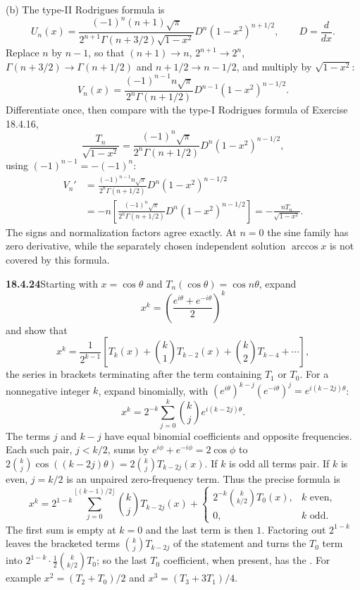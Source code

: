 (b) The type-II Rodrigues formula is
\[
U_n(x)=\frac{(-1)^n(n+1)\sqrt\pi}{2^{n+1}\Gamma(n+3/2)\sqrt{1-x^2}}
 D^n(1-x^2)^{n+1/2},\qquad D=\frac d{dx}.
\]
Replace $n$ by $n-1$, so that $(n+1)\to n$, $2^{n+1}\to2^n$,
$\Gamma(n+3/2)\to\Gamma(n+1/2)$ and $n+1/2\to n-1/2$, and multiply
by $\sqrt{1-x^2}$:
\[
V_n(x)=\frac{(-1)^{n-1}n\sqrt\pi}{2^n\Gamma(n+1/2)}
 D^{n-1}(1-x^2)^{n-1/2}.
\]
Differentiate once, then compare with the type-I Rodrigues formula
of Exercise 18.4.16,
\[
\frac{T_n}{\sqrt{1-x^2}}
 =\frac{(-1)^n\sqrt\pi}{2^n\Gamma(n+1/2)}D^n(1-x^2)^{n-1/2},
\]
using $(-1)^{n-1}=-(-1)^n$:
\begin{align*}
V_n'
 &=\frac{(-1)^{n-1}n\sqrt\pi}{2^n\Gamma(n+1/2)}
      D^n(1-x^2)^{n-1/2}\\
 &=-n\left[\frac{(-1)^n\sqrt\pi}{2^n\Gamma(n+1/2)}
      D^n(1-x^2)^{n-1/2}\right]
 =-\frac{nT_n}{\sqrt{1-x^2}}.
\end{align*}
The signs and normalization factors agree exactly.  At $n=0$ the
sine family has zero derivative, while the separately chosen
independent solution $\arccos x$ is not covered by this formula.

\par\bigskip
\noindent\textbf{18.4.24}\quad Starting with $x=\cos\theta$ and
$T_{n}(\cos\theta)=\cos n\theta$, expand
\[
x^{k}=\left(\frac{e^{i\theta}+e^{-i\theta}}{2}\right)^{k}
\]
and show that
\[
x^{k}=\frac{1}{2^{k-1}}\left[T_{k}(x)+\binom{k}{1}T_{k-2}(x)
+\binom{k}{2}T_{k-4}+\cdots\right],
\]
the series in brackets terminating after the term containing $T_{1}$
or $T_{0}$.
\solution
For a nonnegative integer $k$, expand binomially, with
$(e^{i\theta})^{k-j}(e^{-i\theta})^j=e^{i(k-2j)\theta}$:
\[
x^k=2^{-k}\sum_{j=0}^k\binom kj e^{i(k-2j)\theta}.
\]
The terms $j$ and $k-j$ have equal binomial coefficients and
opposite frequencies.  Each such pair, $j<k/2$, sums by
$e^{i\phi}+e^{-i\phi}=2\cos\phi$ to
$2\binom kj\cos((k-2j)\theta)=2\binom kjT_{k-2j}(x)$.
If $k$ is odd all terms pair.  If $k$ is even, $j=k/2$ is
an unpaired zero-frequency term.  Thus the precise formula is
\[
\boxed{x^k=2^{1-k}\sum_{j=0}^{\lfloor(k-1)/2\rfloor}
 \binom kjT_{k-2j}(x)
 +\begin{cases}2^{-k}\binom k{k/2}T_0(x),&k\text{ even},\\
 0,&k\text{ odd}.
 \end{cases}}
\]
The first sum is empty at $k=0$ and the last term is then $1$.
Factoring out $2^{1-k}$ leaves the bracketed terms
$\binom kjT_{k-2j}$ of the statement and turns the $T_0$ term into
$2^{1-k}\cdot\frac12\binom k{k/2}T_0$; so the last $T_0$ coefficient,
when present, has the .  For example
$x^2=(T_2+T_0)/2$ and $x^3=(T_3+3T_1)/4$.

